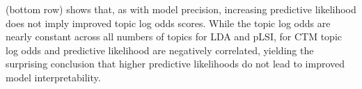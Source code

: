  (bottom row) shows that, as with model
precision, increasing predictive likelihood does not imply improved
topic log odds scores.  While the topic log odds are nearly constant
across all numbers of topics for LDA and pLSI, for CTM topic log odds
and predictive likelihood are negatively correlated, yielding the
surprising conclusion that higher predictive likelihoods do not lead
to improved model interpretability.









